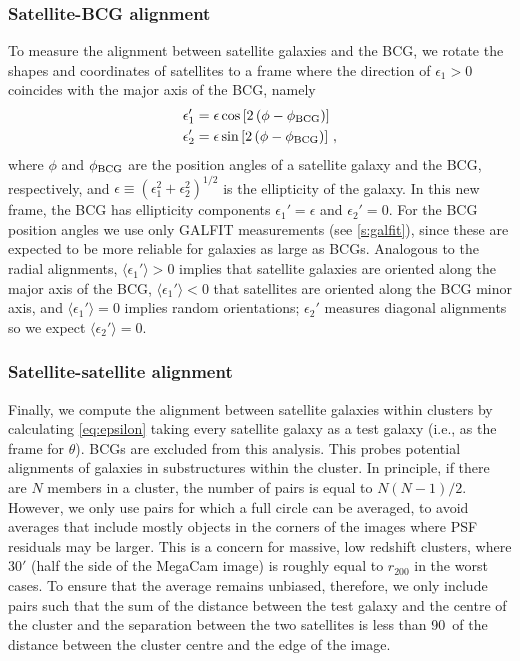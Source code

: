\subsubsection{Satellite-BCG alignment}

To measure the alignment between satellite galaxies and the BCG, we rotate the shapes and 
coordinates of satellites to a frame where the direction of $\epsilon_1>0$ coincides with the 
major axis of the BCG, namely
\begin{equation}\label{eq:bcg}
 \begin{split}
 \epsilon_1' &= \epsilon\cos\left[2\left(\phi-\phi_{\rm BCG}\right)\right] \\
 \epsilon_2' &= \epsilon\sin\left[2\left(\phi-\phi_{\rm BCG}\right)\right]\,,
 \end{split}
\end{equation}
where $\phi$ and $\phi_{\rm BCG}$ are the position angles of a satellite galaxy and the BCG, 
respectively, and $\epsilon\equiv(\epsilon_1^2+\epsilon_2^2)^{1/2}$ is the ellipticity of the 
galaxy. In this new frame, the BCG has ellipticity components $\epsilon_1'=\epsilon$ and 
$\epsilon_2'=0$. For the BCG position angles we use only GALFIT measurements (see \cref{s:galfit}), 
since these are expected to be more reliable for galaxies as large as BCGs. Analogous to the radial 
alignments, $\langle\epsilon_1'\rangle>0$ implies that satellite galaxies are oriented along the 
major axis of the BCG, $\langle\epsilon_1'\rangle<0$ that satellites are oriented along the BCG 
minor axis, and $\langle\epsilon_1'\rangle=0$ implies random orientations; $\epsilon_2'$ measures 
diagonal alignments so we expect $\langle\epsilon_2'\rangle=0$.


\subsubsection{Satellite-satellite alignment}\label{s:shapes-satsat}

Finally, we compute the alignment between satellite galaxies within clusters by calculating 
\cref{eq:epsilon} taking every satellite galaxy as a test galaxy (i.e., as the frame for $\theta$). 
BCGs are excluded from this analysis. This probes potential alignments of galaxies in substructures 
within the cluster. In principle, if there are $N$ members in a cluster, the number of pairs is 
equal to $N(N-1)/2$. However, we only use pairs for which a full circle can be averaged, to avoid 
averages that include mostly objects in the corners of the images where PSF residuals may be 
larger. This is a concern for massive, low redshift clusters, where $30'$ (half the side of 
the MegaCam image) is roughly equal to $r_{200}$ in the worst cases. To ensure that the average 
remains unbiased, therefore, we only include pairs such that the sum of the distance between the 
test galaxy and the centre of the cluster and the separation between the two satellites is less 
than 90\percent\ of the distance between the cluster centre and the edge of the image.


